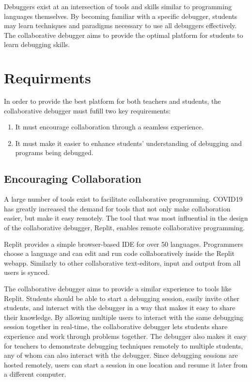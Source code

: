 \documentclass[12pt]{article}
\begin{document}
Debuggers exist at an intersection of tools and skills similar to
programming languages themselves. By becoming familiar with a specific
debugger, students may learn techniques and paradigms necessary to use
all debuggers effectively.  The collaborative debugger aims to provide
the optimal platform for students to learn debugging skills.

\section{Requirments}

In order to provide the best platform for both teachers and students,
the collaborative debugger must fufill two key requirements:

\begin{enumerate}
\item It must encourage collaboration through a seamless experience.
\item It must make it easier to enhance students' understanding of
  debugging and programs being debugged.
\end{enumerate}

\subsection{Encouraging Collaboration} \label{exisitingcollab}

A large number of tools exist to facilitate collaborative programming.
COVID19 has greatly increased the demand for tools that not only make
collaboration easier, but make it easy remotely.  The tool that was
most influential in the design of the collaborative debugger,
Replit\cite{replit}, enables remote collaborative programming.

Replit provides a simple browser-based IDE for over 50 languages.
Programmers choose a language and can edit and run code
collaboratively inside the Replit webapp.  Similarly to other
collaborative text-editors, input and output from all users is synced.
\par

The collaborative debugger aims to provide a similar experience to
tools like Replit.  Students should be able to start a debugging
session, easily invite other students, and interact with the debugger
in a way that makes it easy to share their knowledge.  By allowing
multiple users to interact with the same debugging session together in
real-time, the collaborative debugger lets students share experience
and work through problems together.  The debugger also makes it easy
for teachers to demonstrate debugging techniques remotely to multiple
students, any of whom can also interact with the debugger.  Since
debugging sessions are hosted remotely, users can start a session in
one location and resume it later from a different computer.
\par
\end{document}
